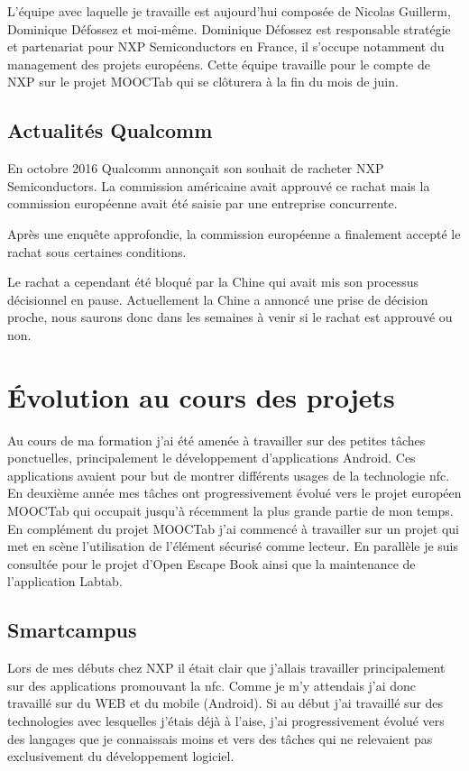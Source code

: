 \documentclass[french,12pt,a4paper,titlepage,openright,openbib]{report}
\begin{document}
L'équipe avec laquelle je travaille est aujourd'hui composée de Nicolas Guillerm, Dominique Défossez et moi-même. Dominique Défossez est responsable stratégie et partenariat pour NXP Semiconductors en France, il s'occupe notamment du management des projets européens.
Cette équipe travaille pour le compte de NXP sur le projet MOOCTab qui se clôturera à la fin du mois de juin.

\section{Actualités Qualcomm}
En octobre 2016 Qualcomm annonçait son souhait de racheter NXP Semiconductors. La commission américaine avait approuvé ce rachat mais la commission européenne avait été saisie par une entreprise concurrente.

Après une enquête approfondie, la commission européenne a finalement accepté le rachat sous certaines conditions.

Le rachat a cependant été bloqué par la Chine qui avait mis son processus décisionnel en pause. Actuellement la Chine a annoncé une prise de décision proche, nous saurons donc dans les semaines à venir si le rachat est approuvé ou non.



\chapter{Évolution au cours des projets}

Au cours de ma formation j'ai été amenée à travailler sur des petites tâches ponctuelles, principalement le développement d'applications Android. Ces applications avaient pour but de montrer différents usages de la technologie \gls{nfc}.
En deuxième année mes tâches ont progressivement évolué vers le projet européen MOOCTab qui occupait jusqu'à récemment la plus grande partie de mon temps.
En complément du projet MOOCTab j'ai commencé à travailler sur un projet qui met en scène l'utilisation de l'élément sécurisé comme lecteur.
En parallèle je suis consultée pour le projet d'Open Escape Book ainsi que la maintenance de l'application Labtab.

\section{Smartcampus}

Lors de mes débuts chez NXP il était clair que j'allais travailler principalement sur des applications promouvant la \gls{nfc}. Comme je m'y attendais j'ai donc travaillé sur du WEB et du mobile (Android).
Si au début j'ai travaillé sur des technologies avec lesquelles j'étais déjà à l'aise, j'ai progressivement évolué vers des langages que je connaissais moins et vers des tâches qui ne relevaient pas exclusivement du développement logiciel.
\end{document}
